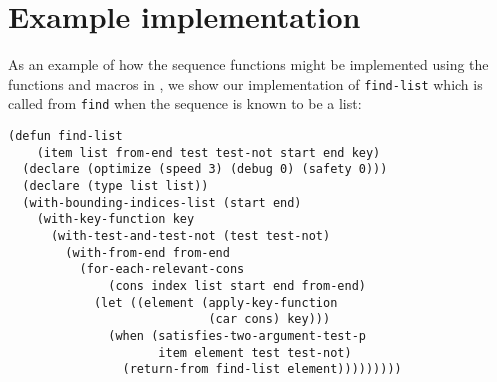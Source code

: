 \section{Example implementation}
\label{app-example-implementation}

As an example of how the sequence functions might be implemented using
the functions and macros in , we show our
implementation of \texttt{find-list} which is called from
\texttt{find} when the sequence is known to be a list:

{\small\begin{verbatim}
(defun find-list
    (item list from-end test test-not start end key)
  (declare (optimize (speed 3) (debug 0) (safety 0)))
  (declare (type list list))
  (with-bounding-indices-list (start end)
    (with-key-function key
      (with-test-and-test-not (test test-not)
        (with-from-end from-end
          (for-each-relevant-cons
              (cons index list start end from-end)
            (let ((element (apply-key-function 
                            (car cons) key)))
              (when (satisfies-two-argument-test-p 
                     item element test test-not)
                (return-from find-list element)))))))))
\end{verbatim}}

